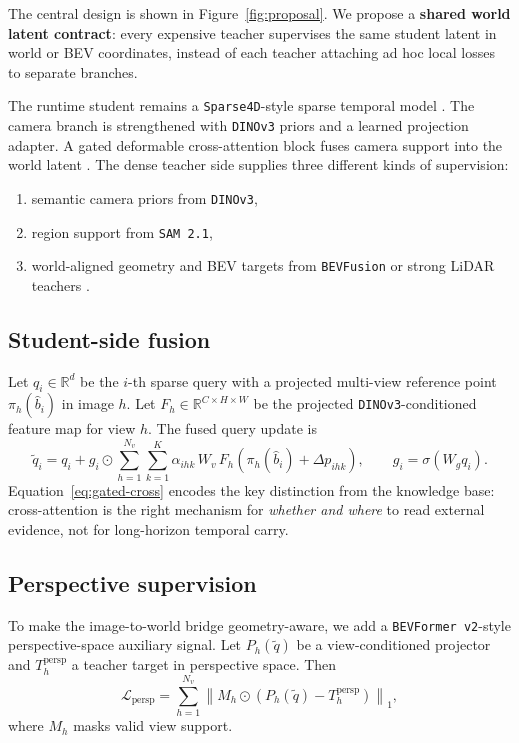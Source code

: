 \documentclass[11pt]{article}
\newcommand{\loss}{\mathcal{L}}
\newcommand{\R}{\mathbb{R}}
\begin{document}
The central design is shown in Figure~\ref{fig:proposal}. We propose a \textbf{shared world latent
contract}: every expensive teacher supervises the same student latent in world or BEV coordinates,
instead of each teacher attaching ad hoc local losses to separate branches.

The runtime student remains a \texttt{Sparse4D}-style sparse temporal model \cite{sparse4d}. The
camera branch is strengthened with \texttt{DINOv3} priors and a learned projection adapter. A
gated deformable cross-attention block fuses camera support into the world latent
\cite{deformabledetr}. The dense teacher side supplies three different kinds of supervision:
\begin{enumerate}[leftmargin=*,itemsep=2pt]
\item semantic camera priors from \texttt{DINOv3},
\item region support from \texttt{SAM 2.1},
\item world-aligned geometry and BEV targets from \texttt{BEVFusion} or strong LiDAR teachers
\cite{bevfusion,openpcdet}.
\end{enumerate}

\subsection{Student-side fusion}
Let \(q_i \in \R^d\) be the \(i\)-th sparse query with a projected multi-view reference point
\(\pi_h(\hat b_i)\) in image \(h\). Let \(F_h \in \R^{C\times H \times W}\) be the projected
\texttt{DINOv3}-conditioned feature map for view \(h\). The fused query update is
\begin{equation}
\tilde q_i
= q_i
+ g_i \odot
\sum_{h=1}^{N_v}\sum_{k=1}^{K}
\alpha_{ihk}\,W_v\,F_h\!\left(\pi_h(\hat b_i)+\Delta p_{ihk}\right),
\qquad
g_i = \sigma(W_g q_i).
\label{eq:gated-cross}
\end{equation}
Equation~\eqref{eq:gated-cross} encodes the key distinction from the knowledge base: cross-attention is the
right mechanism for \emph{whether and where} to read external evidence, not for long-horizon
temporal carry.

\subsection{Perspective supervision}
To make the image-to-world bridge geometry-aware, we add a \texttt{BEVFormer v2}-style
perspective-space auxiliary signal. Let \(P_h(\tilde q)\) be a view-conditioned projector and
\(T_h^{\text{persp}}\) a teacher target in perspective space. Then
\begin{equation}
\loss_{\text{persp}}
=
\sum_{h=1}^{N_v}
\left\|
M_h \odot \left(P_h(\tilde q)-T_h^{\text{persp}}\right)
\right\|_1,
\label{eq:persp}
\end{equation}
where \(M_h\) masks valid view support.
\end{document}

